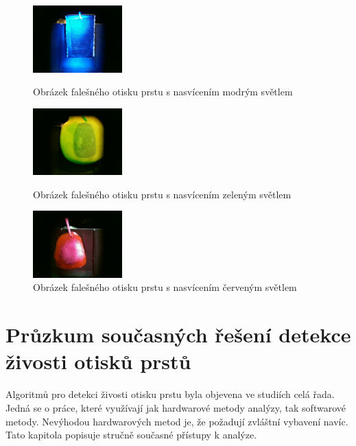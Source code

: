\begin{figure}[!htbp]
  \begin{minipage}[b]{0.3\linewidth}
    \centering
    \includegraphics[width=130px]{obrazky-figures/fake23.jpg}
    \caption{Obrázek falešného otisku prstu s nasvícením modrým světlem}
  \end{minipage}
  \hspace{0.3cm}
  \begin{minipage}[b]{0.3\linewidth}
    \centering
    \includegraphics[width=130px]{obrazky-figures/fake64.jpg}
    \caption{Obrázek falešného otisku prstu s nasvícením zeleným světlem}
  \end{minipage}
  \hspace{0.3cm}
    \begin{minipage}[b]{0.3\linewidth}
    \centering
    \includegraphics[width=130px]{obrazky-figures/fake47.jpg}
    \caption{Obrázek falešného otisku prstu s nasvícením červeným světlem}
  \end{minipage}
\end{figure}

\chapter{Průzkum současných řešení detekce živosti otisků prstů}
\label{chap:Pruzkum}
Algoritmů pro detekci živosti otisku prstu byla objevena ve studiích celá řada. Jedná se o práce, které využívají jak hardwarové metody analýzy, tak softwarové metody. Nevýhodou hardwarových metod je, že požadují zvláštní vybavení navíc. Tato kapitola popisuje stručně současné přístupy k analýze.

